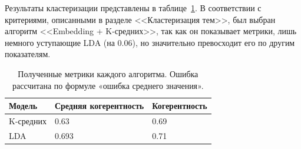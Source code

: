 \documentclass[14pt,a4paper]{article}
\begin{document}
Результаты кластеризации представлены в таблице~\ref{tab:ClusteringPivotTable}. В соответствии с критериями, описанными в разделе <<Кластеризация тем>>, был выбран алгоритм <<Embedding + K-средних>>, так как он показывает метрики, лишь немного уступающие LDA (на 0.06), но значительно превосходит его по другим показателям.



\vspace{1\baselineskip}

\begin{table}[h]
\centering
\vspace{-1em}
\captionsetup{justification=raggedright, singlelinecheck=false}
\caption{Полученные метрики каждого алгоритма. Ошибка рассчитана по формуле «ошибка среднего значения».
}
\small
\begin{tabular}{|l|l|l|}
\hline
\textbf{Модель} & \textbf{Средняя когерентность} & \multicolumn{1}{c|}{\textbf{Когерентность}} \\ \hline
K-средних        & 0.63                & 0.69                                    \\ \hline
LDA            & 0.693          & 0.71                                    \\ \hline
\end{tabular}

\label{tab:ClusteringPivotTable}
\end{table}



\end{document}
